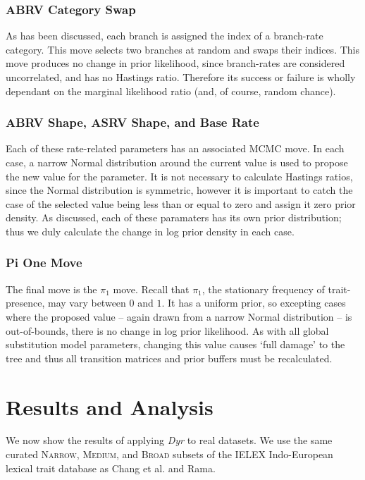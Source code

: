 \documentclass[10pt,journal,compsoc]{IEEEtran}
\begin{document}
\subsubsection{ABRV Category Swap}

As has been discussed, each branch is assigned the index of a branch-rate category. This move selects two branches at random and swaps their indices. This move produces no change in prior likelihood, since branch-rates are considered uncorrelated, and has no Hastings ratio. Therefore its success or failure is wholly dependant on the marginal likelihood ratio (and, of course, random chance).

\subsubsection{ABRV Shape, ASRV Shape, and Base Rate}

Each of these rate-related parameters has an associated MCMC move. In each case, a narrow Normal distribution around the current value is used to propose the new value for the parameter. It is not necessary to calculate Hastings ratios, since the Normal distribution is symmetric, however it is important to catch the case of the selected value being less than or equal to zero and assign it zero prior density. As discussed, each of these paramaters has its own prior distribution; thus we duly calculate the change in log prior density in each case.

\subsubsection{Pi One Move}

The final move is the $\pi_1$ move. Recall that $\pi_1$, the stationary frequency of trait-presence, may vary between $0$ and $1$. It has a uniform prior, so excepting cases where the proposed value -- again drawn from a narrow Normal distribution -- is out-of-bounds, there is no change in log prior likelihood. As with all global substitution model parameters, changing this value causes `full damage' to the tree and thus all transition matrices and prior buffers must be recalculated.

\section{Results and Analysis}\label{sec:results}

We now show the results of applying \textit{Dyr} to real datasets. We use the same curated \textsc{Narrow}, \textsc{Medium}, and \textsc{Broad} subsets of the IELEX Indo-European lexical trait database as Chang et al. and Rama.
\end{document}
